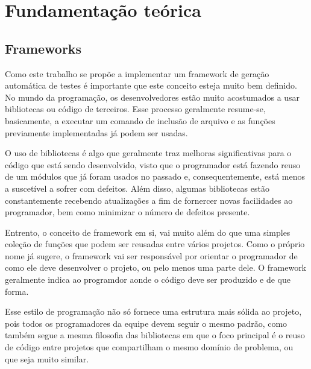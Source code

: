\documentclass[
    12pt,       %
    openright,      %
    twoside,      %
    a4paper,      %
    english,      %
    french,       %
    spanish,      %
    brazil,       %
    ]{abntex2}
\begin{document}
  

  \part{Fundamentação teórica}

  \chapter{Frameworks}

      Como este trabalho se propõe a implementar um framework de geração
      automática de testes é importante que este conceito esteja muito bem
      definido. No mundo da programação, os desenvolvedores estão muito
      acostumados a usar bibliotecas ou código de terceiros. Esse processo
      geralmente resume-se, basicamente, a executar um comando de inclusão
      de arquivo e as funções previamente implementadas já podem ser usadas.

      O uso de bibliotecas é algo que geralmente traz melhoras significativas
      para o código que está sendo desenvolvido, visto que o programador
      está fazendo reuso de um módulos que já foram usados no passado e,
      consequentemente, está menos a suscetível a sofrer com defeitos. Além
      disso, algumas bibliotecas estão constantemente recebendo atualizações
      a fim de fornercer novas facilidades ao programador, bem como minimizar
      o número de defeitos presente.

      Entrento, o conceito de framework em si, vai muito além do que uma
      simples coleção de funções que podem ser reusadas entre vários
      projetos. Como o próprio nome já sugere, o framework vai ser
      responsável por orientar o programador de como ele deve desenvolver
      o projeto, ou pelo menos uma parte dele. O framework geralmente
      indica ao programdor aonde o código deve ser produzido e de que forma.

      Esse estilo de programação não só fornece uma estrutura mais sólida
      ao projeto, pois todos os programadores da equipe devem seguir o mesmo
      padrão, como também segue a mesma filosofia das bibliotecas em que o
      foco principal é o reuso de código entre projetos que compartilham
      o mesmo domínio de problema, ou que seja muito similar.
\end{document}
